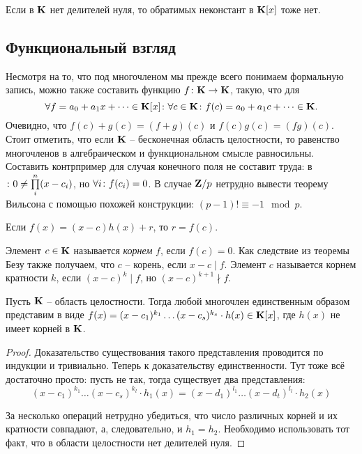 Если в $\mathbf{K}$ нет делителей нуля, то обратимых неконстант в $\mathbf{K}[x]$ тоже нет.

\subsection{Функциональный взгляд}

Несмотря на то, что под многочленом мы прежде всего понимаем формальную запись, можно также составить функцию $f\colon \mathbf{K}\to\mathbf{K}$, такую, что для $$\forall f=a_0+a_1x+\dots\in\mathbf{K}[x]\colon\forall c\in\mathbf{K}\colon f(c)=a_0+a_1c+\dots\in\mathbf{K}.$$
Очевидно, что $f(c)+g(c)=(f+g)(c)$ и $f(c)g(c)=(fg)(c)$. Стоит отметить, что если $\mathbf{K}$ -- бесконечная область целостности, то равенство многочленов в алгебраическом и функциональном смысле равносильны. Составить контрпример для случая конечного поля не составит труда: в $\colon0\ne\prod\limits_i^n(x-c_i)$, но $\forall i\colon f(c_i)=0$. В случае $\mathbf{Z}/p$ нетрудно вывести теорему Вильсона с помощью похожей конструкции: $(p-1)!\equiv-1\mod p$.

\begin{theorem}[Безу]
Если $f(x)=(x-c)h(x)+r$, то $r=f(c)$.
\end{theorem}

\begin{df}
  Элемент $c\in\mathbf{K}$ называется \emph{корнем} $f$, если $f(c)=0$. Как следствие из теоремы Безу также получаем, что $c$ -- корень, если $x-c\mid f$. Элемент $c$ называется корнем кратности $k$, если $(x-c)^k\mid f$, но $(x-c)^{k+1}\nmid f$.
\end{df}

\begin{theorem}
  Пусть $\mathbf{K}$ -- область целостности. Тогда любой многочлен единственным образом представим в виде $f(x)=(x-c_1)^{k_1}\dots(x-c_s)^{k_s}\cdot h(x)\in\mathbf{K}[x]$, где $h(x)$ не имеет корней в $\mathbf{K}$.
\end{theorem}
\begin{proof}
  Доказательство существования такого представления проводится по индукции и тривиально. Теперь к доказательству единственности. Тут тоже всё достаточно просто: пусть не так, тогда существует два представления:
  $$(x-c_1)^{k_1}\dots(x-c_s)^{k_l}\cdot h_1(x)= (x-d_1)^{l_1}\dots(x-d_t)^{l_l}\cdot h_2(x)$$
  
  За несколько операций нетрудно убедиться, что число различных корней и их кратности совпадают, а, следовательно, и $h_1=h_2$. Необходимо использовать тот факт, что в области целостности нет делителей нуля.
\end{proof}


